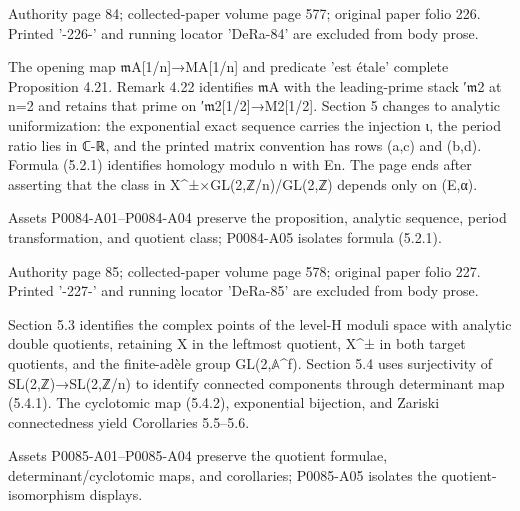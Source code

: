 \documentclass[11pt,a4paper]{article}
\begin{document}
\par\medskip
\hypertarget{D018-P0084}{}
\par\smallskip
Authority page 84; collected-paper volume page 577; original paper folio 226. Printed '-226-' and running locator 'DeRa-84' are excluded from body prose.

The opening map \ensuremath{\mathfrak{m}}\textunderscore{}A[1/n]→M\textunderscore{}A[1/n] and predicate 'est étale' complete Proposition 4.21. Remark 4.22 identifies \ensuremath{\mathfrak{m}}\textunderscore{}A with the leading-prime stack ′\ensuremath{\mathfrak{m}}\textunderscore{}2 at n=2 and retains that prime on ′\ensuremath{\mathfrak{m}}\textunderscore{}2[1/2]→M\textunderscore{}2[1/2]. Section 5 changes to analytic uniformization: the exponential exact sequence carries the injection ι, the period ratio lies in ℂ-ℝ, and the printed matrix convention has rows (a,c) and (b,d). Formula (5.2.1) identifies homology modulo n with E\textunderscore{}n. The page ends after asserting that the class in X\textasciicircum{}±×GL(2,ℤ/n)/GL(2,ℤ) depends only on (E,α).

Assets P0084-A01--P0084-A04 preserve the proposition, analytic sequence, period transformation, and quotient class; P0084-A05 isolates formula (5.2.1).


\par\medskip
\hypertarget{D018-P0085}{}
\par\smallskip
Authority page 85; collected-paper volume page 578; original paper folio 227. Printed '-227-' and running locator 'DeRa-85' are excluded from body prose.

Section 5.3 identifies the complex points of the level-H moduli space with analytic double quotients, retaining X in the leftmost quotient, X\textasciicircum{}± in both target quotients, and the finite-adèle group GL(2,\ensuremath{\mathbb{A}}\textasciicircum{}f). Section 5.4 uses surjectivity of SL(2,ℤ)→SL(2,ℤ/n) to identify connected components through determinant map (5.4.1). The cyclotomic map (5.4.2), exponential bijection, and Zariski connectedness yield Corollaries 5.5--5.6.

Assets P0085-A01--P0085-A04 preserve the quotient formulae, determinant/cyclotomic maps, and corollaries; P0085-A05 isolates the quotient-isomorphism displays.
\end{document}
